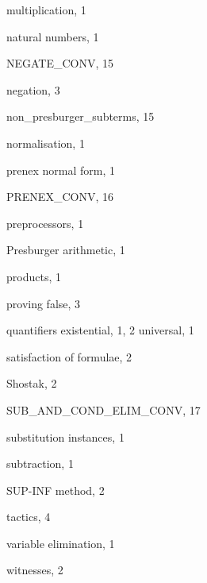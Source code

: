 \begin{theindex}
  \indexspace

  \item multiplication, 1

  \indexspace

  \item natural numbers, 1
  \item {\ptt NEGATE\_CONV}, 15
  \item negation, 3
  \item {\ptt non\_presburger\_subterms}, 15
  \item normalisation, 1

  \indexspace

  \item prenex normal form, 1
  \item {\ptt PRENEX\_CONV}, 16
  \item preprocessors, 1
  \item Presburger arithmetic, 1
  \item products, 1
  \item proving false, 3

  \indexspace

  \item quantifiers
    \subitem existential, 1, 2
    \subitem universal, 1

  \indexspace

  \item satisfaction of formulae, 2
  \item Shostak, 2
  \item {\ptt SUB\_AND\_COND\_ELIM\_CONV}, 17
  \item substitution instances, 1
  \item subtraction, 1
  \item SUP-INF method, 2

  \indexspace

  \item tactics, 4

  \indexspace

  \item variable elimination, 1

  \indexspace

  \item witnesses, 2

\end{theindex}

